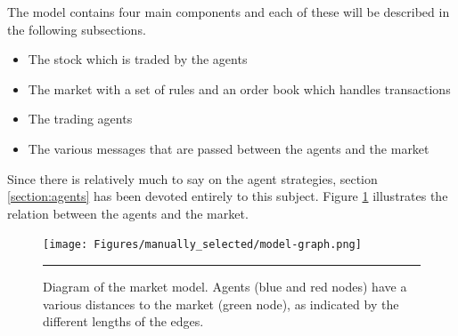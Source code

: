 The model contains four main components and each of these will be described in the following subsections. 
\begin{itemize}
\item The stock which is traded by the agents
\item The market with a set of rules and an order book which handles transactions
\item The trading agents
\item The various messages that are passed between the agents and the market
\end{itemize}
Since there is relatively much to say on the agent strategies, section \ref{section:agents} has been devoted entirely to this subject.
Figure \ref{fig:agents_and_market} illustrates the relation between the agents and the market. 
\begin{figure}[htbp]
	\centering
		\texttt{[image: Figures/manually\_selected/model-graph.png]}
		\rule{35em}{0.5pt}
	\caption{Diagram of the market model. Agents (blue and red nodes) have a various distances to the market (green node), as indicated by the different lengths of the edges.}
	\label{fig:agents_and_market}
\end{figure}

